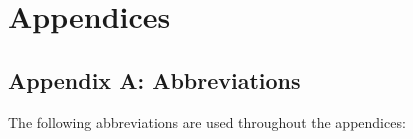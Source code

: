 \documentclass[american,]{article}
\begin{document}
\FloatBarrier



\hypertarget{appendices}{%
\section*{Appendices}\label{appendices}}

\hypertarget{AppendixA}{%
\subsection*{Appendix A: Abbreviations}\label{AppendixA}}

The following abbreviations are used throughout the appendices:
\end{document}
